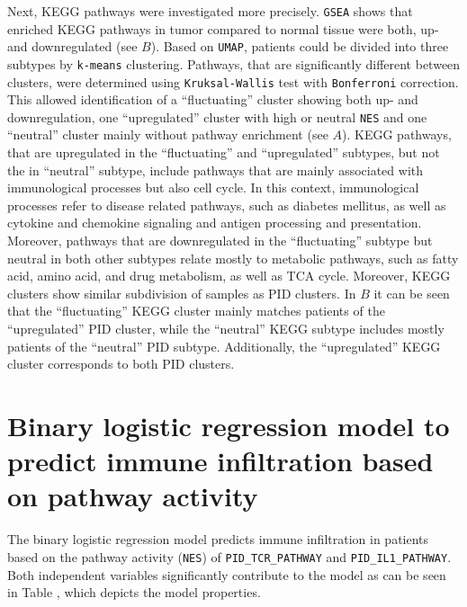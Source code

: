 \documentclass[
  parskip,
  oneside]{scrreprt}
\begin{document}
Next, KEGG pathways were investigated more precisely. \texttt{GSEA}
shows that enriched KEGG pathways in tumor compared to normal tissue
were both, up- and downregulated (see  \(B\)). Based on
\texttt{UMAP}, patients could be divided into three subtypes by
\texttt{k-means} clustering. Pathways, that are significantly different
between clusters, were determined using \texttt{Kruksal-Wallis} test
with \texttt{Bonferroni} correction. This allowed identification of a
``fluctuating'' cluster showing both up- and downregulation, one
``upregulated'' cluster with high or neutral \texttt{NES} and one
``neutral'' cluster mainly without pathway enrichment (see 
\(A\)). KEGG pathways, that are upregulated in the ``fluctuating'' and
``upregulated'' subtypes, but not the in ``neutral'' subtype, include
pathways that are mainly associated with immunological processes but
also cell cycle. In this context, immunological processes refer to
disease related pathways, such as diabetes mellitus, as well as cytokine
and chemokine signaling and antigen processing and presentation.\\
Moreover, pathways that are downregulated in the ``fluctuating'' subtype
but neutral in both other subtypes relate mostly to metabolic pathways,
such as fatty acid, amino acid, and drug metabolism, as well as TCA
cycle. Moreover, KEGG clusters show similar subdivision of samples as
PID clusters. In  \(B\) it can be seen that the
``fluctuating'' KEGG cluster mainly matches patients of the
``upregulated'' PID cluster, while the ``neutral'' KEGG subtype includes
mostly patients of the ``neutral'' PID subtype. Additionally, the
``upregulated'' KEGG cluster corresponds to both PID clusters.

\hypertarget{binary-logistic-regression-model-to-predict-immune-infiltration-based-on-pathway-activity}{%
\section{Binary logistic regression model to predict immune infiltration
based on pathway
activity}\label{binary-logistic-regression-model-to-predict-immune-infiltration-based-on-pathway-activity}}

The binary logistic regression model predicts immune infiltration in
patients based on the pathway activity (\texttt{NES}) of
\texttt{PID\_TCR\_PATHWAY} and \texttt{PID\_IL1\_PATHWAY}. Both
independent variables significantly contribute to the model as can be
seen in Table , which depicts the model properties.
\end{document}

